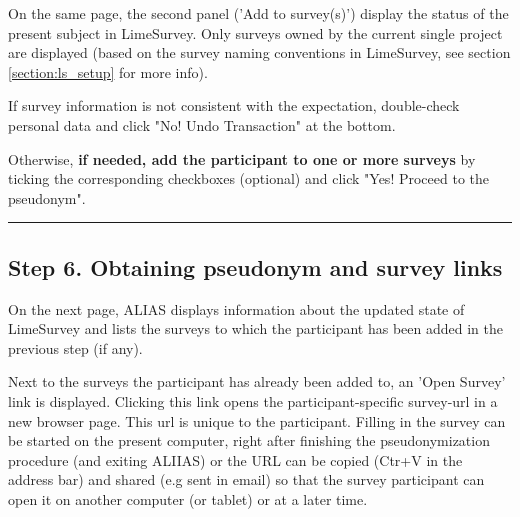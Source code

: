 On the same page, the second panel ('Add to survey(s)') display the status of the present subject in LimeSurvey. Only surveys owned by the current single project are displayed (based on the survey naming conventions in LimeSurvey, see section \ref{section:ls_setup} for more info).

\small\setlength\fboxsep{5pt}\setlength\fboxrule{1pt}

\large

If survey information is not consistent with the expectation, double-check personal data and click "No! Undo Transaction" at the bottom.

Otherwise, \textbf{if needed, add the participant to one or more surveys} by ticking the corresponding checkboxes (optional) and click "Yes! Proceed to the pseudonym".

\small\setlength\fboxsep{5pt}\setlength\fboxrule{1pt}

\large
\par\noindent\rule{\textwidth\color{pniblue}}{0.4pt}
\subsection*{Step 6. Obtaining pseudonym and survey links}

On the next page, ALIAS displays information about the updated state of LimeSurvey and lists the surveys to which the participant has been added in the previous step (if any).

Next to the surveys the participant has already been added to, an 'Open Survey' link is displayed. Clicking this link opens the participant-specific survey-url in a new browser page. This url is unique to the participant. Filling in the survey can be started on the present computer, right after finishing the pseudonymization procedure (and exiting ALIIAS) or the URL can be copied (Ctr+V in the address bar) and shared (e.g sent in email) so that the survey participant can open it on another computer (or tablet) or at a later time.

